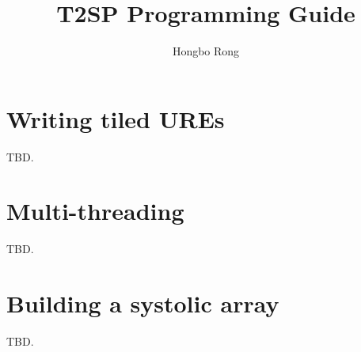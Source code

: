 \documentclass[oneside]{book}
\title{T2SP Programming Guide}
\author{Hongbo Rong}
\begin{document}
\maketitle

\tableofcontents
\lstlistoflistings



\chapter{Writing tiled UREs}
TBD.
\chapter{Multi-threading}
TBD.
\chapter{Building a systolic array}
TBD.



\end{document}
